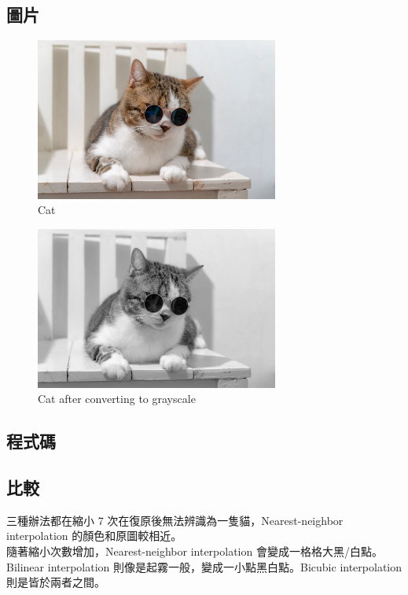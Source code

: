 \documentclass[conference]{IEEEtran}
\begin{document}
\subsection{圖片}
\begin{figure}[H]
\centerline{\includegraphics[width=8cm]{cat.jpg}}
\caption{Cat}
\label{fig}
\end{figure}
\begin{figure}[H]
\centerline{\includegraphics[width=8cm]{grayCat.jpg}}
\caption{Cat after converting to grayscale}
\label{fig}
\end{figure}

\subsection{程式碼}


\subsection{比較}
三種辦法都在縮小 7 次在復原後無法辨識為一隻貓，Nearest-neighbor interpolation 的顏色和原圖較相近。\\

隨著縮小次數增加，Nearest-neighbor interpolation 會變成一格格大黑/白點。Bilinear interpolation 則像是起霧一般，變成一小點黑白點。Bicubic interpolation 則是皆於兩者之間。
\end{document}
